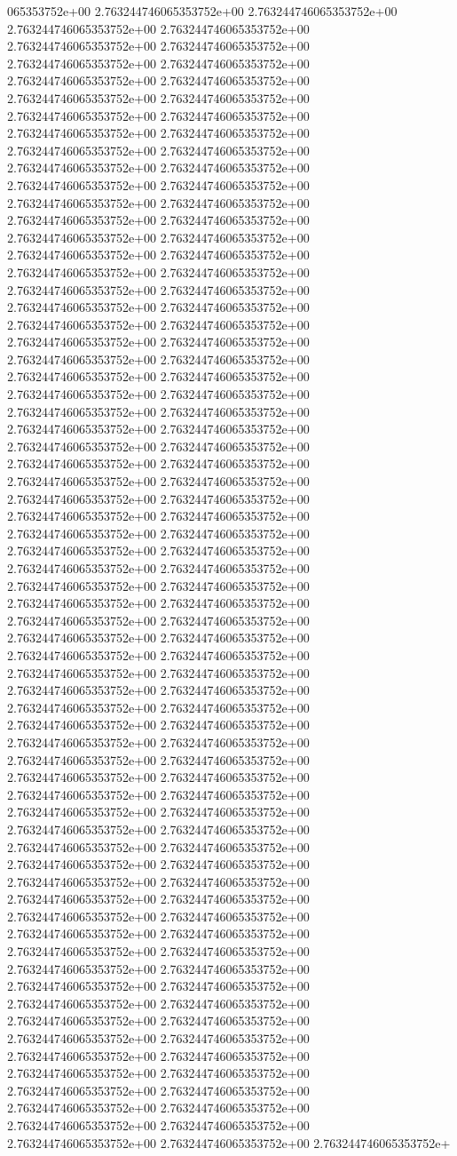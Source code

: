 065353752e+00	2.763244746065353752e+00	2.763244746065353752e+00	2.763244746065353752e+00	2.763244746065353752e+00	2.763244746065353752e+00	2.763244746065353752e+00	2.763244746065353752e+00	2.763244746065353752e+00	2.763244746065353752e+00	2.763244746065353752e+00	2.763244746065353752e+00	2.763244746065353752e+00	2.763244746065353752e+00	2.763244746065353752e+00	2.763244746065353752e+00	2.763244746065353752e+00	2.763244746065353752e+00	2.763244746065353752e+00	2.763244746065353752e+00	2.763244746065353752e+00	2.763244746065353752e+00	2.763244746065353752e+00	2.763244746065353752e+00	2.763244746065353752e+00	2.763244746065353752e+00	2.763244746065353752e+00	2.763244746065353752e+00	2.763244746065353752e+00	2.763244746065353752e+00	2.763244746065353752e+00	2.763244746065353752e+00	2.763244746065353752e+00	2.763244746065353752e+00	2.763244746065353752e+00	2.763244746065353752e+00	2.763244746065353752e+00	2.763244746065353752e+00	2.763244746065353752e+00	2.763244746065353752e+00	2.763244746065353752e+00	2.763244746065353752e+00	2.763244746065353752e+00	2.763244746065353752e+00	2.763244746065353752e+00	2.763244746065353752e+00	2.763244746065353752e+00	2.763244746065353752e+00	2.763244746065353752e+00	2.763244746065353752e+00	2.763244746065353752e+00	2.763244746065353752e+00	2.763244746065353752e+00	2.763244746065353752e+00	2.763244746065353752e+00	2.763244746065353752e+00	2.763244746065353752e+00	2.763244746065353752e+00	2.763244746065353752e+00	2.763244746065353752e+00	2.763244746065353752e+00	2.763244746065353752e+00	2.763244746065353752e+00	2.763244746065353752e+00	2.763244746065353752e+00	2.763244746065353752e+00	2.763244746065353752e+00	2.763244746065353752e+00	2.763244746065353752e+00	2.763244746065353752e+00	2.763244746065353752e+00	2.763244746065353752e+00	2.763244746065353752e+00	2.763244746065353752e+00	2.763244746065353752e+00	2.763244746065353752e+00	2.763244746065353752e+00	2.763244746065353752e+00	2.763244746065353752e+00	2.763244746065353752e+00	2.763244746065353752e+00	2.763244746065353752e+00	2.763244746065353752e+00	2.763244746065353752e+00	2.763244746065353752e+00	2.763244746065353752e+00	2.763244746065353752e+00	2.763244746065353752e+00	2.763244746065353752e+00	2.763244746065353752e+00	2.763244746065353752e+00	2.763244746065353752e+00	2.763244746065353752e+00	2.763244746065353752e+00	2.763244746065353752e+00	2.763244746065353752e+00	2.763244746065353752e+00	2.763244746065353752e+00	2.763244746065353752e+00	2.763244746065353752e+00	2.763244746065353752e+00	2.763244746065353752e+00	2.763244746065353752e+00	2.763244746065353752e+00	2.763244746065353752e+00	2.763244746065353752e+00	2.763244746065353752e+00	2.763244746065353752e+00	2.763244746065353752e+00	2.763244746065353752e+00	2.763244746065353752e+00	2.763244746065353752e+00	2.763244746065353752e+00	2.763244746065353752e+00	2.763244746065353752e+00	2.763244746065353752e+00	2.763244746065353752e+00	2.763244746065353752e+00	2.763244746065353752e+00	2.763244746065353752e+00	2.763244746065353752e+00	2.763244746065353752e+00	2.763244746065353752e+00	2.763244746065353752e+00	2.763244746065353752e+00	2.763244746065353752e+00	2.763244746065353752e+00	2.763244746065353752e+00	2.763244746065353752e+00	2.763244746065353752e+00	2.763244746065353752e+00	2.763244746065353752e+00	2.763244746065353752e+00	2.763244746065353752e+
